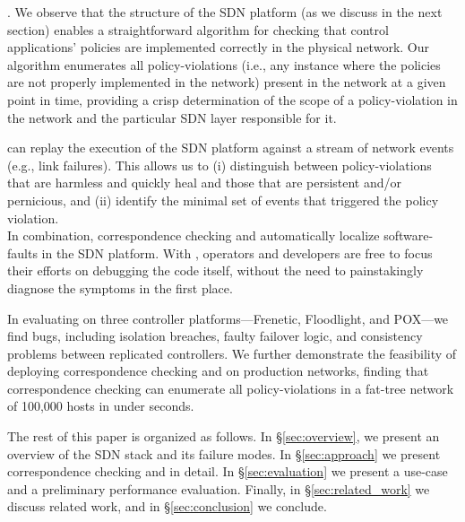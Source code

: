 . We observe that the structure of the
SDN platform (as we discuss in the next section) enables a straightforward algorithm for
checking that control applications' policies are implemented correctly in
the physical network. Our algorithm enumerates all policy-violations (i.e., any instance where the policies are not properly implemented in the network) present in the network at a given point in
time, providing a crisp determination of the scope of a policy-violation in the
network and the particular SDN layer responsible 
for it.

 \projectname{} can replay the execution of the SDN platform against
a stream of network events (e.g., link failures). This allows us to (i) distinguish between policy-violations that are harmless and quickly heal and those that are persistent and/or pernicious, and (ii) identify the minimal set of events that triggered
the policy violation. \\

In combination, correspondence checking and \simulator{} automatically localize software-faults in the SDN platform.
With \projectname{}, operators and developers are free to focus their efforts on debugging the code itself, without the need to 
painstakingly diagnose the symptoms in the first place.

In evaluating \projectname{} on
three controller platforms---Frenetic, Floodlight, and POX---we find  bugs,
including isolation breaches,
faulty failover logic, and consistency problems between replicated
controllers. We further demonstrate the feasibility of deploying
correspondence checking and \simulator{} on production networks,
finding that correspondence checking can enumerate all policy-violations in a
fat-tree network of 100,000 hosts in under  seconds.

The rest of this paper is organized as follows. In \S\ref{sec:overview},
we present an overview of the SDN stack and its failure modes.
In \S\ref{sec:approach} we present correspondence checking and
\simulator{} in detail. In \S\ref{sec:evaluation} we present
a use-case and a preliminary performance evaluation.
Finally, in \S\ref{sec:related_work} we discuss related work,
and in \S\ref{sec:conclusion} we conclude.

